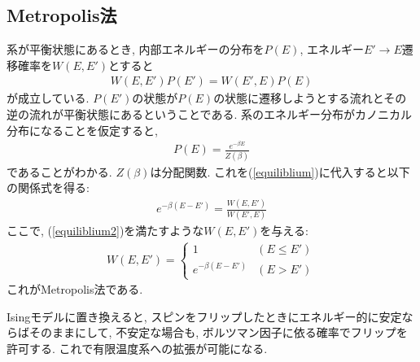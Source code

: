 \documentclass[10.5pt,a4paper]{jreport}
\begin{document}
\subsection{Metropolis法}
系が平衡状態にあるとき, 内部エネルギーの分布を$P(E)$, エネルギー$E' \rightarrow E$遷移確率を$W(E, E')$とすると
\begin{eqnarray}
  W(E, E')P(E') = W(E', E)P(E)\label{equiliblium}
\end{eqnarray}
が成立している. $P(E')$の状態が$P(E)$の状態に遷移しようとする流れとその逆の流れが平衡状態にあるということである. 系のエネルギー分布がカノニカル分布になることを仮定すると, 
\begin{eqnarray}
  P(E) = \frac{e^{-\beta E}}{Z(\beta)}
\end{eqnarray}
であることがわかる. $Z(\beta)$は分配関数. これを(\ref{equiliblium})に代入すると以下の関係式を得る:
\begin{eqnarray}
  e^{-\beta(E-E')} = \frac{W(E, E')}{W(E', E)}\label{equiliblium2}
\end{eqnarray}
ここで, (\ref{equiliblium2})を満たすような$W(E, E')$を与える: 
\begin{eqnarray}
  W(E, E') =
  \begin{cases}
    1 & (E \leq E')\\
    e^{-\beta(E-E')} & (E > E')
  \end{cases}
\end{eqnarray}
これがMetropolis法である.

Isingモデルに置き換えると, スピンをフリップしたときにエネルギー的に安定ならばそのままにして, 不安定な場合も, ボルツマン因子に依る確率でフリップを許可する. これで有限温度系への拡張が可能になる. 
\newpage
\end{document}
